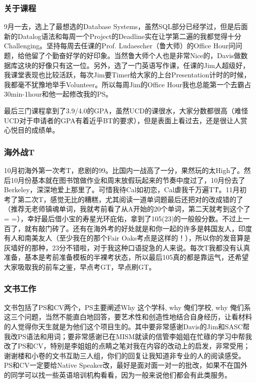\subsubsection{关于课程}
9月一去，选上了最想选的Database Systems，虽然SQL部分已经学过，但是后面新的Datalog语法和每周一个Project的Deadline实在让学第二遍的我都觉得十分Challenging。坚持每周去任课的Prof. Ludaescher（鲁大师）的Office Hour问问题，给他留了个勤奋好学的好印象。当然鲁大师个人也是非常Nice的，Davis做数据库这块的好像只有这一位。另外，选了一门英语写作课，任课的Jim人超级好，我课堂表现也比较活跃，每次Jim要Timer给大家的上台Presentation计时的时候，我都毫不犹豫地举手Volunteer。所以每周Jim的Office Hour我也总能第一个去霸占30min-1hour和他一起修改我的PS。\par
最后三门课程拿到了3.9/4.0的GPA，虽然UCD的课很水，大家分数都很高（难怪UCD对于申请者的GPA有着近乎BT的要求），但是表面上看过去，还是很让人赏心悦目的成绩单。\par
\subsubsection{海外战T}
10月初海外第一次考T，悲剧的99。比国内一战高了一分，果然玩的太High了。然后10月份基本就在图书馆做作业和周末放假玩起来的节奏中度过了，10月份去了Berkeley，深深地爱上那里了。可惜我待Cal如初恋，Cal虐我千万遍T\^T。11月初考了第二次T，感觉无比的糟糕，尤其阅读一道单词题最后还把对的改成错的了（推荐无老师镇魂单词，我就考前看了从A开始的20个单词，第二天就考到这个了= =），幸好最后借小宝的寿星光环庇佑，拿到了105(23)的一般般分数。不过上一百了，就有敲门砖了。还有在海外考的好处就是和你一起的许多是韩国友人，印度有人和南美友人（至少我在的那个Fair Oaks考点是这样的！），所以你的发音算是灰墙好的那种，23分不错啦，对于我这种口语捉急的人来说。每次T我都没有认真准备，基本是考前准备模板的半裸考状态，所以最后105真的都是靠运气，还希望大家吸取我的前车之鉴，早点考GT，早点刷GT。\par
\subsubsection{文书工作}
文书包括了PS和CV两个，PS主要阐述Why 这个学科, why 俺们学校, why 俺们系这三个问题，当然不能直白地回答，要艺术性和创造性地结合自身经历，让看材料的人觉得你天生就是为他们这个项目生的。其中要非常感谢Davis的Jim和SASC帮我改PS语法和用词；要非常感谢已在MISM就读的信管李姐姐在忙碌的学习中帮我改了PS和CV，特别是李姐姐的点睛之笔对我在内容的改动上的启发，非常受用；谢谢楼和小卷的文书互助三人组，你们的回复让我知道非专业的人的阅读感受。PS和CV一定要给Native Speaker改，最好是面对面一对一的批改，如果不在国外的同学可以找一些英语培训机构看看，因为一般来说他们都会有此类服务。\par
